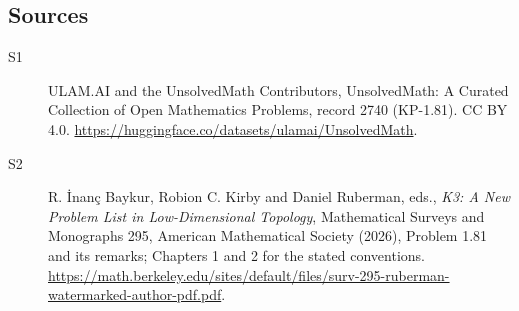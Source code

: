 \documentclass[11pt]{article}
\begin{document}
\subsection{Sources}
\begin{description}
\item[\hypertarget{source:2740:1}{S1}] ULAM.AI and the UnsolvedMath Contributors, UnsolvedMath: A Curated Collection of Open Mathematics Problems, record 2740 (KP-1.81). CC BY 4.0. \url{https://huggingface.co/datasets/ulamai/UnsolvedMath}.
\item[\hypertarget{source:2740:2}{S2}] R. İnanç Baykur, Robion C. Kirby and Daniel Ruberman, eds., \emph{K3: A New Problem List in Low-Dimensional Topology}, Mathematical Surveys and Monographs 295, American Mathematical Society (2026), Problem 1.81 and its remarks; Chapters 1 and 2 for the stated conventions. \url{https://math.berkeley.edu/sites/default/files/surv-295-ruberman-watermarked-author-pdf.pdf}.
\end{description}
\label{end:2740}
\end{document}
